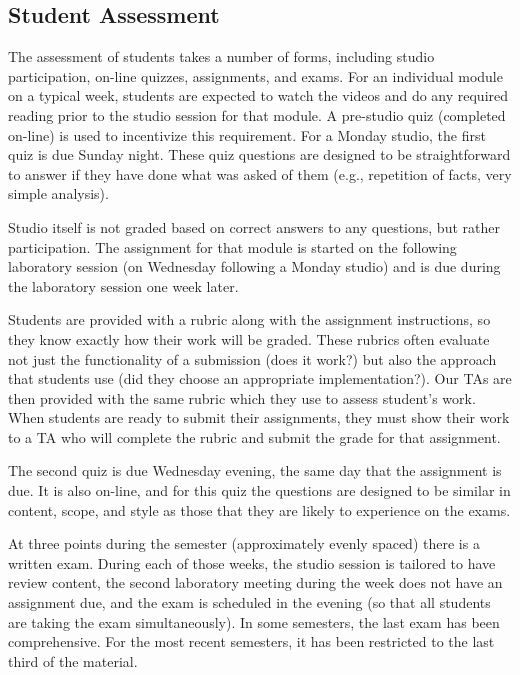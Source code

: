 \subsection{Student Assessment}

The assessment of students takes a number of forms, including studio
participation, on-line quizzes, assignments, and exams.
For an individual module on a typical week,
students are expected to watch the videos
and do any required reading prior to the studio session for that module.
A pre-studio quiz (completed on-line) is used to incentivize this
requirement.  For a Monday studio, the first quiz is due Sunday night.
These quiz questions are designed to be straightforward to answer if
they have done what was asked of them (e.g., repetition of facts,
very simple analysis).

Studio itself is not graded based on correct answers to any questions, but
rather participation. The assignment for that module is started on the
following laboratory session (on Wednesday following a Monday studio)
and is due during the laboratory session one week later.

Students are provided with a rubric along with the assignment instructions,
so they know exactly how their work will be graded. These rubrics often evaluate
not just the functionality of a submission (does it work?) but also the approach
that students use (did they choose an appropriate implementation?). Our TAs are then
provided with the same rubric which they use to assess student's work. When
students are ready to submit their assignments, they must show their work
to a TA who will complete the rubric and submit the grade for that assignment.

The second quiz is due Wednesday evening, the same day that the assignment
is due. It is also on-line, and for this quiz the questions are designed
to be similar in content, scope, and style as those that they are likely to
experience on the exams. 

At three points during the semester (approximately evenly spaced) there
is a written exam.  During each of those weeks, the
studio session is tailored to have review content, the second laboratory
meeting during the week does not have an assignment due, and the
exam is scheduled in the evening (so that all students are taking the
exam simultaneously).
In some semesters, the last exam has been comprehensive.  For the most
recent semesters, it has been restricted to the last third of the material.
